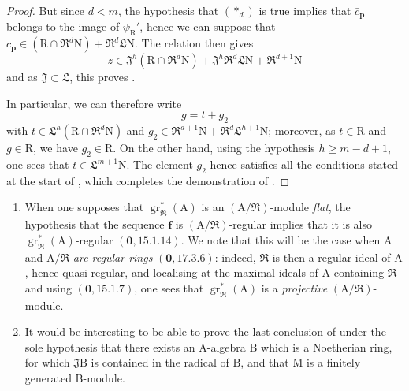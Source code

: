 \begin{proof}
But since $d<m$, the hypothesis that $(*_d)$ is true implies that $\bar{c}_\mathbf{p}$ belongs to the image of $\psi_\mathrm{R}'$, hence we can suppose that $c_\mathbf{p}\in(\mathrm{R}\cap\mathfrak{R}^d\mathrm{N})+\mathfrak{R}^d\mathfrak{L}\mathrm{N}$. The relation  then gives
\[
  z\in\mathfrak{J}^h(\mathrm{R}\cap\mathfrak{R}^d\mathrm{N})+\mathfrak{J}^h\mathfrak{R}^d\mathfrak{L}\mathrm{N}+\mathfrak{R}^{d+1}\mathrm{N}
\]
and as $\mathfrak{J}\subset\mathfrak{L}$, this proves .

In particular, we can therefore write
\[
  g=t+g_2
\]
with $t\in\mathfrak{L}^h(\mathrm{R}\cap\mathfrak{R}^d\mathrm{N})$ and $g_2\in\mathfrak{R}^{d+1}\mathrm{N}+\mathfrak{R}^d\mathfrak{L}^{h+1}\mathrm{N}$; moreover, as $t\in\mathrm{R}$ and $g\in\mathrm{R}$, we have $g_2\in\mathrm{R}$. On the other hand, using the hypothesis $h\geqslant m-d+1$, one sees that $t\in\mathfrak{L}^{m+1}\mathrm{N}$. The element $g_2$ hence satisfies all the conditions stated at the start of , which completes the demonstration of .
\end{proof}

\begin{remarks}[19.7.2]
\label{IV.19.7.2}
\medskip\noindent
\begin{enumerate}
\item[\rm(i)] When one supposes that $\operatorname{gr}_\mathfrak{R}^*(\mathrm{A})$ is an $(\mathrm{A}/\mathfrak{R})$-module \emph{flat}, the hypothesis that the sequence $\mathbf{f}$ is $(\mathrm{A}/\mathfrak{R})$-regular implies that it is also $\operatorname{gr}_\mathfrak{R}^*(\mathrm{A})$-regular $(\mathbf{0},15.1.14)$. We note that this will be the case when $\mathrm{A}$ and $\mathrm{A}/\mathfrak{R}$ \emph{are regular rings} $(\mathbf{0},17.3.6)$: indeed, $\mathfrak{R}$ is then a regular ideal of $\mathrm{A}$ , hence quasi-regular, and localising at the maximal ideals of $\mathrm{A}$ containing $\mathfrak{R}$ and using $(\mathbf{0},15.1.7)$, one sees that $\operatorname{gr}_\mathfrak{R}^*(\mathrm{A})$ is a \emph{projective} $(\mathrm{A}/\mathfrak{R})$-module.
\item[\rm(ii)] It would be interesting to be able to prove the last conclusion of  under the sole hypothesis that there exists an $\mathrm{A}$-algebra $\mathrm{B}$ which is a Noetherian ring, for which $\mathfrak{J}\mathrm{B}$ is contained in the radical of $\mathrm{B}$, and that $\mathrm{M}$ is a finitely generated $\mathrm{B}$-module.
\end{enumerate}
\end{remarks}

